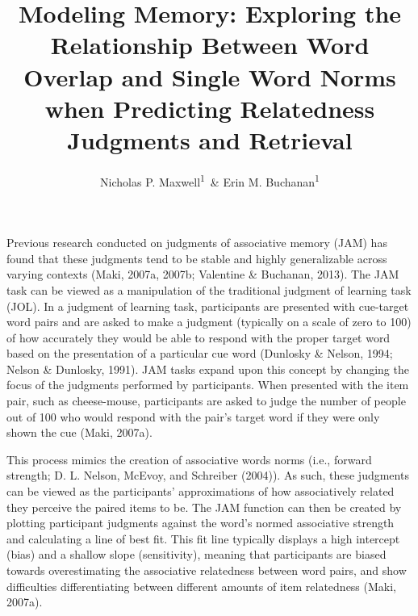 \documentclass[english,man]{apa6}
\title{Modeling Memory: Exploring the Relationship Between Word Overlap and
Single Word Norms when Predicting Relatedness Judgments and Retrieval}
\author{Nicholas P. Maxwell\textsuperscript{1}~\& Erin M. Buchanan\textsuperscript{1}}
\affiliation{
    \vspace{0.5cm}
          \textsuperscript{1} Missouri State University  }
\theoremstyle{definition}
\theoremstyle{definition}
\theoremstyle{remark}
\begin{document}
\maketitle

\setcounter{secnumdepth}{0}



Previous research conducted on judgments of associative memory (JAM) has
found that these judgments tend to be stable and highly generalizable
across varying contexts (Maki, 2007a, 2007b; Valentine \& Buchanan,
2013). The JAM task can be viewed as a manipulation of the traditional
judgment of learning task (JOL). In a judgment of learning task,
participants are presented with cue-target word pairs and are asked to
make a judgment (typically on a scale of zero to 100) of how accurately
they would be able to respond with the proper target word based on the
presentation of a particular cue word (Dunlosky \& Nelson, 1994; Nelson
\& Dunlosky, 1991). JAM tasks expand upon this concept by changing the
focus of the judgments performed by participants. When presented with
the item pair, such as cheese-mouse, participants are asked to judge the
number of people out of 100 who would respond with the pair's target
word if they were only shown the cue (Maki, 2007a).

This process mimics the creation of associative words norms (i.e.,
forward strength; D. L. Nelson, McEvoy, and Schreiber (2004)). As such,
these judgments can be viewed as the participants' approximations of how
associatively related they perceive the paired items to be. The JAM
function can then be created by plotting participant judgments against
the word's normed associative strength and calculating a line of best
fit. This fit line typically displays a high intercept (bias) and a
shallow slope (sensitivity), meaning that participants are biased
towards overestimating the associative relatedness between word pairs,
and show difficulties differentiating between different amounts of item
relatedness (Maki, 2007a).
\end{document}

